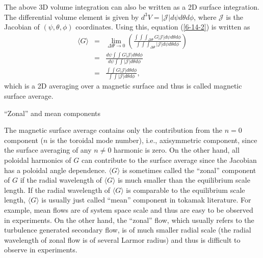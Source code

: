 \documentclass{article}
\begin{document}
The above 3D volume integration can also be written as a 2D surface
integration. The differential volume element is given by $d^3 V = |
\mathcal{J} | d \psi d \theta d \phi$, where $\mathcal{J}$ is the Jacobian of
$(\psi, \theta, \phi)$ coordinates. Using this, equation (\ref{6-14-2}) is
written as
\begin{eqnarray}
  \langle G \rangle & = & \lim_{\Delta \Psi \rightarrow 0} \left( \frac{\int
  \int \int_{\Delta \Psi} G | \mathcal{J} | d \psi d \theta d \phi}{\int \int
  \int_{\Delta \Psi} | \mathcal{J} | d \psi d \theta d \phi} \right)
  \nonumber\\
  & = & \frac{d \psi \int \int G | \mathcal{J} | d \theta d \phi}{d \psi \int
  \int | \mathcal{J} | d \theta d \phi} \nonumber\\
  & = & \frac{\int \int G | \mathcal{J} | d \theta d \phi}{\int \int |
  \mathcal{J} | d \theta d \phi}, 
\end{eqnarray}
which is a 2D averaging over a magnetic surface and thus is called magnetic
surface average.

\hrulefill

``Zonal'' and mean components

The magnetic surface average contains only the contribution from the $n = 0$
component ($n$ is the toroidal mode number), i.e., axisymmetric component,
since the surface averaging of any $n \neq 0$ harmonic is zero. On the other
hand, all poloidal harmonics of $G$ can contribute to the surface average
since the Jacobian has a poloidal angle dependence. $\langle G \rangle$ is
sometimes called the ``zonal'' component of $G$ if the radial wavelength of
$\langle G \rangle$ is much smaller than the equilibrium scale length. If the
radial wavelength of $\langle G \rangle$ is comparable to the equilibrium
scale length, $\langle G \rangle$ is usually just called ``mean'' component in
tokamak literature. For example, mean flows are of system space scale and thus
are easy to be observed in experiments. On the other hand, the ``zonal'' flow,
which usually refers to the turbulence generated secondary flow, is of much
smaller radial scale (the radial wavelength of zonal flow is of several Larmor
radius) and thus is difficult to observe in experiments.

\hrulefill
\end{document}
